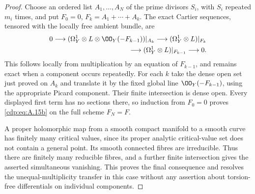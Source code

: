 \begin{proof}
Choose an ordered list $A_1,\ldots,A_N$ of the prime divisors $S_i$, with $S_i$ repeated $m_i$ times, and put $F_0=0$, $F_k=A_1+\cdots+A_k$. The exact Cartier sequences, tensored with the locally free ambient bundle, are
\[
\begin{split}
0\longrightarrow
 (\Omega_Y^1\otimes L\otimes\OO_Y(-F_{k-1}))|_{A_k}
 \longrightarrow (\Omega_Y^1\otimes L)|_{F_k}\\
 \longrightarrow(\Omega_Y^1\otimes L)|_{F_{k-1}}
 \longrightarrow0.
\end{split}
\]
This follows locally from multiplication by an equation of $F_{k-1}$, and remains exact when a component occurs repeatedly. For each $k$ take the dense open set just proved on $A_k$ and translate it by the fixed global line $\OO_Y(-F_{k-1})$, using the appropriate Picard component. Their finite intersection is dense open. Every displayed first term has no sections there, so induction from $F_0=0$ proves \eqref{cdp:eq:A.15b} on the full scheme $F_N=F$.

A proper holomorphic map from a smooth compact manifold to a smooth curve has finitely many critical values, since its proper analytic critical-value set does not contain a general point. Its smooth connected fibres are irreducible. Thus there are finitely many reducible fibres, and a further finite intersection gives the asserted simultaneous vanishing. This proves the final consequence and resolves the unequal-multiplicity transfer in this case without any assertion about torsion-free differentials on individual components.
\end{proof}


